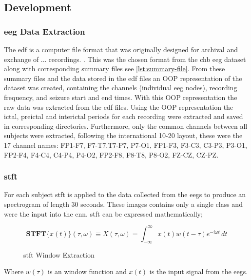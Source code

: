 \documentclass[12pt]{article}
\begin{document}
\subsection{Development}


\subsubsection{\acrfull{eeg} Data Extraction}

The \acrfull{edf} \cite{kemp1992simple} is a computer file format that was originally designed for archival and exchange  of ... recordings. \cite{kemp2013european}. This was the chosen format from the \acrshort{chb} \acrshort{eeg} dataset along with corresponding summary files see \ref{lst:summary-file}. From these summary files and the data stored in the \acrshort{edf} files an OOP representation of the dataset was created, containing the channels (individual \acrshort{eeg} nodes), recording frequency, and seizure start and end times. With this OOP representation the raw data was extracted from the \acrshort{edf} files. Using the OOP representation the ictal, preictal and interictal periods for each recording were extracted and saved in corresponding directories. Furthermore, only the common channels between all subjects were extracted, following the international 10-20 layout, these were the 17 channel names: FP1-F7, F7-T7,T7-P7, P7-O1, FP1-F3, F3-C3, C3-P3, P3-O1, FP2-F4, F4-C4, C4-P4, P4-O2, FP2-F8, F8-T8, P8-O2, FZ-CZ, CZ-PZ.

\subsubsection{\acrfull{stft}}

For each subject \acrshort{stft} is applied to the data collected from the \acrshort{eegs} to produce an spectrogram of length 30 seconds. These images contains only a single class and were the input into the \acrshort{cnn}. \acrshort{stft} can be expressed mathematically;\\ 

\begin{figure}[H]
\[  \mathbf{STFT}\{x(t)\}(\tau,\omega) \equiv X(\tau, \omega) = \int_{-\infty}^{\infty} x(t) w(t-\tau) e^{-i \omega t} \, d t   \]
\caption{\acrfull{stft} Window Extraction}
\label{eq:stft}
\end{figure}

Where $w(\tau)$ is an window function and $x(t)$ is the input signal from the \acrshort{eegs}.\\
\end{document}

